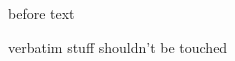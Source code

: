 before text 
\begin{commandshell}
   verbatim
        stuff
shouldn't be touched
\end{commandshell} %
